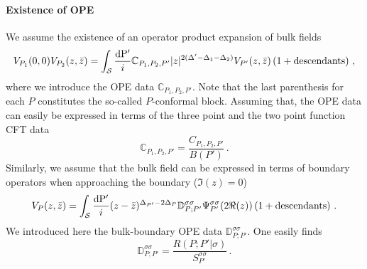 \documentclass[a4paper]{article}
\begin{document}
\paragraph{Existence of OPE} We assume the existence of an operator product expansion of bulk fields
\begin{equation}
  V_{P_1}(0,0)V_{P_2}(z,\bar{z}) = \int_{\mathcal{S}} \frac{\rm{d}P'}{i} \mathbb{C}_{P_1,P_2,P' }|z|^{2(\Delta'-\Delta_1-\Delta_2)}V_{P'}(z,\bar{z})\left(1+ \text{descendants}\right)\,,
\end{equation}
where we introduce the OPE data $\mathbb{C}_{P_1,P_2,P' }$. Note that the last parenthesis for each $P$ constitutes the so-called $P$-conformal block. Assuming that, the OPE data can easily be expressed in terms of the three point and the two point function CFT data
\begin{equation}
  \mathbb{C}_{P_1,P_2,P'} = \frac{C_{P_1,P_2,P'}}{B(P')}\,.
\end{equation}
Similarly, we assume that the bulk field can be expressed in terms of boundary operators when approaching the boundary ($\Im(z)=0$)
\begin{equation}
  V_{P}(z,\bar{z}) = \int_{\mathcal{S}} \frac{\rm{d}P'}{i} (z-\bar{z})^{\Delta_{P'}-2\Delta_{P}}\mathbb{D}_{P ; P'}^{\sigma \sigma} \Psi_{P'}^{\sigma \sigma}(2\Re(z))\left(1+ \text{descendants}\right)\,.
\end{equation}
We introduced here the bulk-boundary OPE data $\mathbb{D}_{P ; P'}^{\sigma \sigma}$. One easily finds
\begin{equation}
  \mathbb{D}_{P ; P'}^{\sigma \sigma} = \frac{R(P;P'|\sigma)}{S_{P'}^{\sigma \sigma}}\,.
\end{equation}
\end{document}
